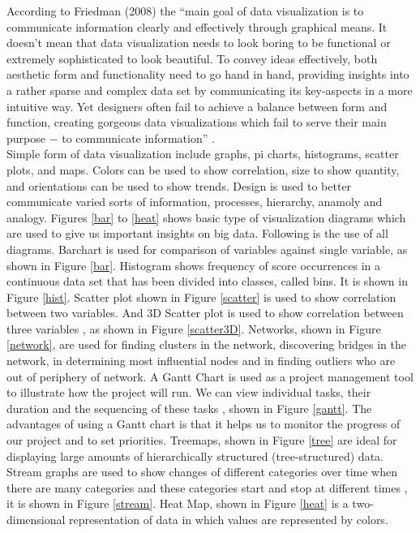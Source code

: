 According to Friedman (2008) the ``main goal of data visualization is to communicate information clearly and effectively through graphical means. It doesn't mean that data visualization needs to look boring to be functional or extremely sophisticated to look beautiful. To convey ideas effectively, both aesthetic form and functionality need to go hand in hand, providing insights into a rather sparse and complex data set by communicating its key-aspects in a more intuitive way. Yet designers often fail to achieve a balance between form and function, creating gorgeous data visualizations which fail to serve their main purpose $-$ to communicate information'' \cite{Intro03}.\\

Simple form of data visualization include graphs, pi charts, histograms, scatter plots, and maps. Colors can be used to show correlation, size to show quantity, and orientations can be used to show trends. Design is used to better communicate varied sorts of information, processes, hierarchy, anamoly and analogy. Figures  \ref{bar} to \ref{heat} shows basic type of visualization diagrams which are used to give us important insights on  big data. Following is the use of all diagrams. Barchart is used for comparison of variables against single variable, as shown in Figure \ref{bar}. Histogram shows frequency of score occurrences in a continuous data set that has been divided into classes, called bins. It is shown in Figure \ref{hist}. Scatter plot shown in Figure \ref{scatter} is used to show correlation between two variables. And 3D Scatter plot is used to show correlation between three variables , as shown in Figure \ref{scatter3D}. Networks, shown in Figure \ref{network}, are used for finding clusters in the network, discovering bridges in the network, in determining most influential nodes and in finding outliers who are out of periphery of network. A Gantt Chart is used as a project management tool to illustrate how the project will run. We can view individual tasks, their duration and the sequencing of these tasks , shown in Figure \ref{gantt}. The advantages of using a Gantt chart is that it helps us to monitor the progress of our project and to set priorities. Treemaps, shown in Figure \ref{tree} are ideal for displaying large amounts of hierarchically structured (tree-structured) data. Stream graphs are used to show changes of different categories over time when there are many categories and these categories start and stop at different times , it is shown in Figure \ref{stream}. Heat Map, shown in Figure \ref{heat} is a two-dimensional representation of data in which values are represented by colors.


